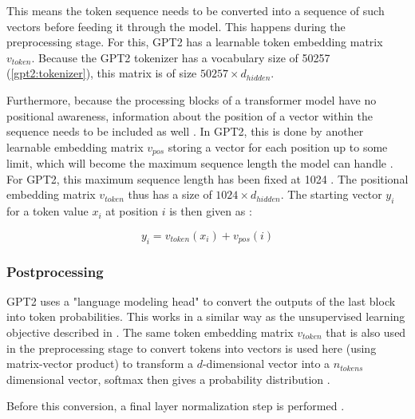 This means the token sequence needs to be converted into a sequence of such vectors before feeding it through the model. This happens during the preprocessing stage.
For this, GPT2 has a learnable token embedding matrix $v_{token}$.  Because the GPT2 tokenizer has a vocabulary size of 50257 (\cref{gpt2:tokenizer}), this matrix is of size $50257 \times d_{hidden}$.

\begin{samepage}

Furthermore, because the processing blocks of a transformer model have no positional awareness, information about the position of a vector within the sequence needs to be included as well .
In GPT2, this is done by another learnable embedding matrix $v_{pos}$ storing a vector for each position up to some limit, which will become the maximum sequence length the model can handle   . For GPT2, this maximum sequence length has been fixed at 1024  \cite{HuggingFaceGPT2}.
The positional embedding matrix $v_{token}$ thus has a size of $1024 \times d_{hidden}$.
The starting vector $y_i$ for a token value $x_i$ at position $i$ is then given as :

$$y_i = v_{token}(x_i) + v_{pos}(i)$$

\end{samepage}

\subsubsection{Postprocessing}


\label{gpt2:postproc}

GPT2 uses a "language modeling head" \cite{HuggingFaceGPT2} to convert the outputs of the last block into token probabilities. This works in a similar way as the unsupervised learning objective described in . The same token embedding matrix $v_{token}$ that is also used in the preprocessing stage to convert tokens into vectors is used here (using matrix-vector product) to transform a $d$-dimensional vector into a $n_{tokens}$ dimensional vector, softmax then gives a probability distribution \cite{github-hf} .

Before this conversion, a final layer normalization step is performed .


